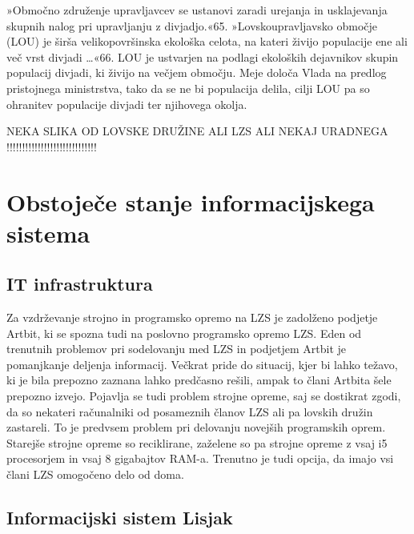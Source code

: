 \documentclass[a4paper,12pt,openright]{book}
\begin{document}
»Območno združenje upravljavcev se ustanovi zaradi urejanja in usklajevanja skupnih nalog pri upravljanju z divjadjo.«{65}.
»Lovskoupravljavsko območje (LOU) je širša velikopovršinska ekološka celota, na kateri živijo populacije ene ali več vrst divjadi …«{66}. 
LOU je ustvarjen na podlagi ekoloških dejavnikov skupin populacij divjadi, ki živijo na večjem območju. 
Meje določa Vlada na predlog pristojnega ministrstva, tako da se ne bi populacija delila, cilji LOU pa so ohranitev populacije divjadi ter njihovega okolja.

NEKA SLIKA OD LOVSKE DRUŽINE ALI LZS ALI NEKAJ URADNEGA !!!!!!!!!!!!!!!!!!!!!!!!!!!!!





\chapter{Obstoječe stanje informacijskega sistema}
\label{stanje}






\section{IT infrastruktura}

Za vzdrževanje strojno in programsko opremo na LZS je zadolženo podjetje Artbit, ki se spozna tudi na poslovno programsko opremo LZS.
Eden od trenutnih problemov pri sodelovanju med LZS in podjetjem Artbit je pomanjkanje deljenja informacij. 
Večkrat pride do situacij, kjer bi lahko težavo, ki je bila prepozno zaznana lahko predčasno rešili, ampak to člani Artbita šele prepozno izvejo.
Pojavlja se tudi problem strojne opreme, saj se dostikrat zgodi, da so nekateri računalniki od posameznih članov LZS ali pa lovskih družin zastareli.
To je predvsem problem pri delovanju novejših programskih oprem.
Starejše strojne opreme so reciklirane, zaželene so pa strojne opreme z vsaj i5 procesorjem in vsaj 8 gigabajtov RAM-a.
Trenutno je tudi opcija, da imajo vsi člani LZS omogočeno delo od doma.

\section{Informacijski sistem Lisjak}
\end{document}
